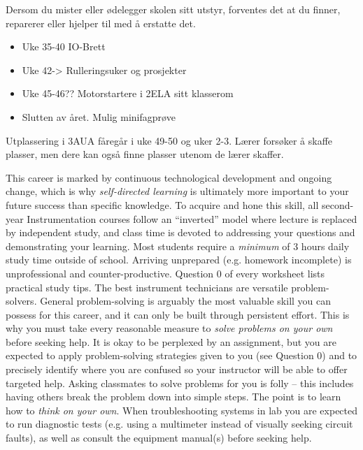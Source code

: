 \documentclass[12pt,a4paper]{book}
\begin{document}
%

\noindent
{} Dersom du mister eller ødelegger skolen sitt utstyr, forventes det at du finner, reparerer eller hjelper til med å erstatte det. 
\vskip 10pt
\vfil
\noindent
{} 
\begin{itemize}
	\item Uke 35-40 IO-Brett
	\item Uke 42-> Rulleringsuker og prosjekter
	\item Uke 45-46?? Motorstartere i 2ELA sitt klasserom
	\item Slutten av året. Mulig minifagprøve
\end{itemize}
\vskip 10pt
\vfil
\noindent
{} Utplassering i 3AUA fåregår i uke 49-50 og uker 2-3. Lærer forsøker å skaffe plasser, men dere kan også finne plasser utenom de lærer skaffer. 
\vskip 10pt
\vfil


\noindent
{} This career is marked by continuous technological development and ongoing change, which is why {\it self-directed learning} is ultimately more important to your future success than specific knowledge.  To acquire and hone this skill, all second-year Instrumentation courses follow an ``inverted'' model where lecture is replaced by independent study, and class time is devoted to addressing your questions and demonstrating your learning.  Most students require a {\it minimum} of 3 hours daily study time outside of school.  Arriving unprepared (e.g. homework incomplete) is unprofessional and counter-productive.  Question 0 of every worksheet lists practical study tips.
\vskip 10pt
\noindent
{} The best instrument technicians are versatile problem-solvers.  General problem-solving is arguably the most valuable skill you can possess for this career, and it can only be built through persistent effort.  This is why you must take every reasonable measure to {\it solve problems on your own} before seeking help.  It is okay to be perplexed by an assignment, but you are expected to apply problem-solving strategies given to you (see Question 0) and to precisely identify where you are confused so your instructor will be able to offer targeted help.  Asking classmates to solve problems for you is folly -- this includes having others break the problem down into simple steps.  The point is to learn how to {\it think on your own}.  When troubleshooting systems in lab you are expected to run diagnostic tests (e.g. using a multimeter instead of visually seeking circuit faults), as well as consult the equipment manual(s) before seeking help.  
\vskip 10pt
\eject
\end{document}
